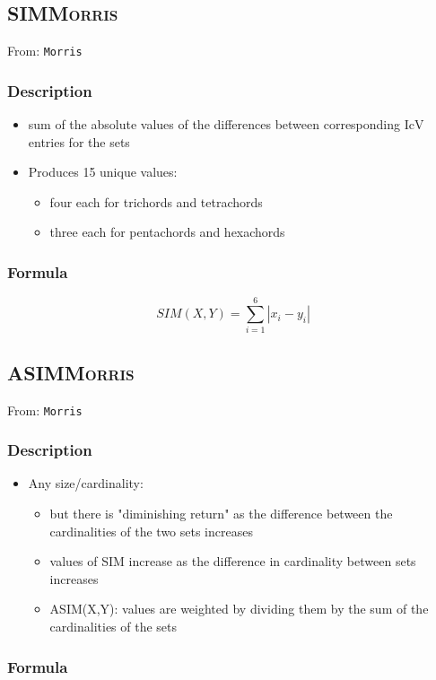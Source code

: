 \documentclass[11pt]{article}
\begin{document}
\subsection{SIM\hfill{}\textsc{Morris}}
\label{sec-3-8}
From: \texttt{Morris}
\subsubsection{Description}
\label{sec-3-8-1}

\begin{itemize}
\item sum of the absolute values of the differences between
corresponding IcV entries for the sets
\item Produces 15 unique values:
\begin{itemize}
\item four each for trichords and tetrachords
\item three each for pentachords and hexachords
\end{itemize}
\end{itemize}
\subsubsection{Formula}
\label{sec-3-8-2}
$$ SIM \left ( X, Y \right ) = \sum_{i = 1}^{6} \left | x_{i} - y_{i} \right | $$   

\subsection{ASIM\hfill{}\textsc{Morris}}
\label{sec-3-9}
From: \texttt{Morris}
\subsubsection{Description}
\label{sec-3-9-1}
\begin{itemize}
\item Any size/cardinality:
\begin{itemize}
\item but there is "diminishing return" as the difference between the
cardinalities of the two sets increases
\item values of SIM increase as the difference in cardinality between
sets increases
\item ASIM(X,Y): values are weighted by dividing them by the sum of
the cardinalities of the sets
\end{itemize}
\end{itemize}
\subsubsection{Formula}
\label{sec-3-9-2}
\end{document}
